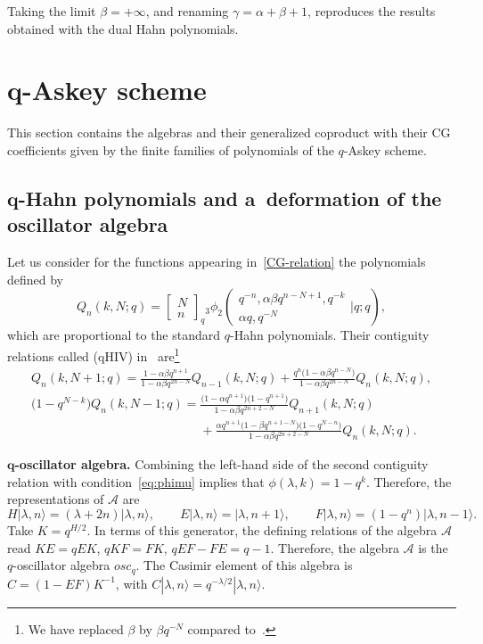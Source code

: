 \documentclass[pdftex]{sigma}
\numberwithin{equation}{section}
\theoremstyle{definition}
\begin{document}
Taking the limit $\beta=+\infty$, and renaming $\gamma=\alpha+\beta+1$, reproduces the results obtained with the dual Hahn polynomials.

\section[q-Askey scheme]{$\boldsymbol{q}$-Askey scheme}\label{sec:qaskey}

This section contains the algebras and their generalized coproduct with their CG coefficients given by the finite families of polynomials of the $q$-Askey scheme.

\subsection[q-Hahn polynomials and a~deformation of the oscillator algebra]{$\boldsymbol{q}$-Hahn polynomials and a~deformation of the oscillator algebra}

Let us consider for the functions appearing in~\eqref{CG-relation} the polynomials defined by
\[Q_n(k,N;q)=
\left[\begin{array}{c} N \\ n \end{array}\right]_q
{}_3\phi_2\left(\begin{array}{c} q^{-n}, \alpha\beta q^{n-N+1}, q^{-k} \\ \alpha q, q^{-N}\end{array}\Bigg\vert q;q\right),\]
which are proportional to the standard $q$-Hahn polynomials.
Their contiguity relations called (qHIV) in~\cite{contiguity} are\footnote{We have replaced $\beta$ by $\beta q^{-N}$ compared to~\cite{contiguity}.}
\begin{gather*}
Q_n(k,N+1;q)=\frac{1-\alpha\beta q^{n+1}}{1-\alpha\beta q^{2n-N}}Q_{n-1}(k,N;q)+\frac{q^n\bigl(1-\alpha\beta q^{n-N}\bigr)}{1-\alpha\beta q^{2n-N}}Q_n(k,N;q),\\
\bigl(1-q^{N-k}\bigr)Q_n(k,N-1;q)=\frac{\bigl(1-\alpha q^{n+1}\bigr)\bigl(1-q^{n+1}\bigr)}{1-\alpha\beta q^{2n+2-N}}Q_{n+1}(k,N;q)\\
\phantom{\bigl(1-q^{N-k}\bigr)Q_n(k,N-1;q)=}{}+\frac{\alpha q^{n+1}\bigl(1-\beta q^{n+1-N}\bigr)\bigl(1-q^{N-n}\bigr)}{1-\alpha\beta q^{2n+2-N}}Q_n(k,N;q).
\end{gather*}


{\bf $\boldsymbol{q}$-oscillator algebra.} Combining the left-hand side of the second contiguity relation with condition~\eqref{eq:phimu} implies that
$\phi(\lambda,k)=1-q^k$.
Therefore, the representations of $\mathcal{A}$ are
\[H|\lambda,n\rangle=(\lambda+2n)|\lambda,n\rangle, \qquad
E|\lambda,n\rangle=|\lambda,n+1\rangle, \qquad
F|\lambda,n\rangle=(1-q^n)|\lambda,n-1\rangle.\]
Take $ K=q^{H/2}$.
In terms of this generator, the defining relations of the algebra $\mathcal{A}$ read
$
KE=q EK$, $ q KF=FK$, $ qEF-FE=q-1$.
Therefore, the algebra $\mathcal{A}$ is the $q$-oscillator algebra $osc_q$.
The Casimir element of this algebra is~${C=(1-EF)K^{-1}}$, with $C|\lambda,n\rangle=q^{-\lambda/2}|\lambda,n\rangle $.
\end{document}
